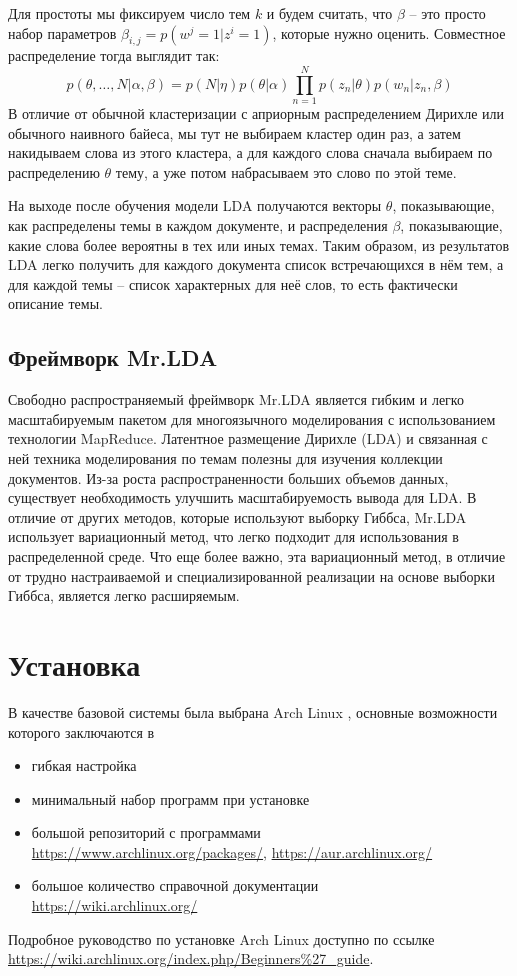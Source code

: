 Для простоты мы фиксируем число тем \( k \) и будем считать, что \( \beta \) -- это просто набор параметров 
\( \beta_{i,j} = p(w^j = 1 | z^i = 1)\), которые нужно оценить. Совместное распределение тогда выглядит так:
\[
    p(\theta,\ldots,N|\alpha,\beta) = 
        p(N|\eta)p(\theta|\alpha)\prod\limits_{n=1}^{N}p(z_n|\theta)p(w_n|z_n,\beta)
\]
В отличие от обычной кластеризации с априорным распределением Дирихле или обычного наивного байеса, мы тут 
не выбираем кластер один раз, а затем накидываем слова из этого кластера, а для каждого слова сначала 
выбираем по распределению \( \theta \) тему, а уже потом набрасываем это слово по этой теме.

На выходе после обучения модели LDA получаются векторы \( \theta \), показывающие, как распределены темы в 
каждом документе, и распределения \( \beta \), показывающие, какие слова более вероятны в тех или иных 
темах. Таким образом, из результатов LDA легко получить для каждого документа список встречающихся в нём 
тем, а для каждой темы -- список характерных для неё слов, то есть фактически описание темы.\cite{lda}

\section{Фреймворк Mr.LDA}
Свободно распространяемый фреймворк Mr.LDA \cite{mrldainfo} является гибким и легко масштабируемым пакетом 
для многоязычного моделирования с использованием технологии MapReduce. Латентное размещение Дирихле (LDA) и 
связанная с ней техника моделирования по темам полезны для изучения коллекции документов. Из-за роста 
распространенности больших объемов данных, существует необходимость улучшить масштабируемость вывода для 
LDA. В отличие от других методов, которые используют выборку Гиббса, Mr.LDA использует вариационный метод, 
что легко подходит для использования в распределенной среде. Что еще более важно, эта вариационный метод, в 
отличие от трудно настраиваемой и специализированной реализации на основе выборки Гиббса, является 
легко расширяемым.

\chapter{Установка}
В качестве базовой системы была выбрана Arch Linux \cite{arch}, основные возможности которого заключаются в 
\begin{itemize}
    \item гибкая настройка
    \item минимальный набор программ при установке
    \item большой репозиторий с программами \\
        \url{https://www.archlinux.org/packages/}, \url{https://aur.archlinux.org/}
    \item большое количество справочной документации\\
        \url{https://wiki.archlinux.org/}
\end{itemize}
Подробное руководство по установке Arch Linux доступно по ссылке\\
\url{https://wiki.archlinux.org/index.php/Beginners%27_guide}.

